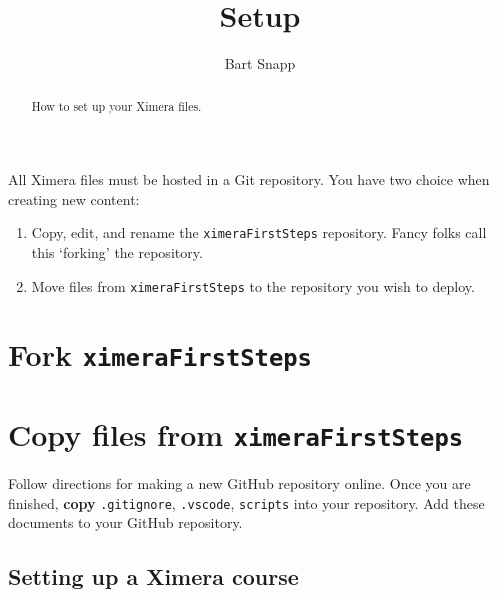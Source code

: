 \documentclass{ximera}
\title{Setup}
\author{Bart Snapp}
\begin{document}
\begin{abstract}
    How to set up your Ximera files.
\end{abstract}
\maketitle

All Ximera files must be hosted in a Git repository. You have two choice when creating new content: 
\begin{enumerate}
    \item Copy, edit, and rename the \texttt{ximeraFirstSteps} repository. Fancy folks call this `forking' the repository.
    \item Move files from \texttt{ximeraFirstSteps} to the repository you wish to deploy.
\end{enumerate}


\section{Fork \texttt{ximeraFirstSteps}}


\section{Copy files from \texttt{ximeraFirstSteps}}
 Follow directions for making a new GitHub repository online.
Once you are finished, \textbf{copy} \verb|.gitignore|, \verb|.vscode|, \verb|scripts| into your repository. 
Add these documents to your GitHub repository. 



\subsection{Setting up a Ximera course}
 
 
 
\end{document}
